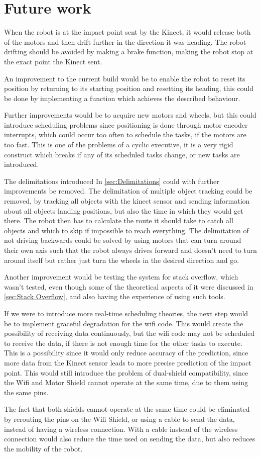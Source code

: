 \chapter{Future work}
\label{chap:FutureWork}
When the robot is at the impact point sent by the Kinect, it would release both of the motors and then drift further in the direction it was heading. The robot drifting should be avoided by making a brake function, making the robot stop at the exact point the Kinect sent.

An improvement to the current build would be to enable the robot to reset its position by returning to its starting position and resetting its heading, this could be done by implementing a function which achieves the described behaviour.

Further improvements would be to acquire new motors and wheels, but this could introduce scheduling problems since positioning is done through motor encoder interrupts, which could occur too often to schedule the tasks, if the motors are too fast.
This is one of the problems of a cyclic executive, it is a very rigid construct which breaks if any of its scheduled tasks change, or new tasks are introduced.

The delimitations introduced In \ref{sec:Delimitations} could with further improvements be removed. The delimitation of multiple object tracking could be removed, by tracking all objects with the kinect sensor and sending information about all objects landing positions, but also the time in which they would get there. The robot then has to calculate the route it should take to catch all objects and which to skip if impossible to reach everything. The delimitation of not driving backwards could be solved by using motors that can turn around their own axis such that the robot always drives forward and doesn’t need to turn around itself but rather just turn the wheels in the desired direction and go.

Another improvement would be testing the system for stack overflow, which wasn't tested, even though some of the theoretical aspects of it were discussed in \ref{sec:Stack Overflow}, and also  having the experience of using such tools.

If we were to introduce more real-time scheduling theories, the next step would be to implement graceful degradation for the wifi code. This would create the possibility of receiving data continuously, but the wifi code may not be scheduled to receive the data, if there is not enough time for the other tasks to execute. This is a possibility since it would only reduce accuracy of the prediction, since more data from the Kinect sensor leads to more precise prediction of the impact point. This would still introduce the problem of dual-shield compatibility, since the Wifi and Motor Shield cannot operate at the same time, due to them using the same pins.

The fact that both shields cannot operate at the same time could be eliminated by rerouting the pins on the Wifi Shield, or using a cable to send the data, instead of having a wireless connection. With a cable instead of the wireless connection would also reduce the time used on sending the data, but also reduces the mobility of the robot.
